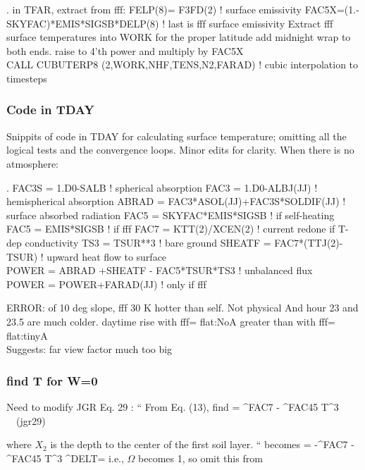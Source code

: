 .
\qi in TFAR, extract from fff: FELP(8)= F3FD(2)        ! surface emissivity
\qi FAC5X=(1.-SKYFAC)*EMIS*SIGSB*DELP(8) ! last is fff surface emissivity
\qi Extract fff surface temperatures into WORK for the proper latitude
\qii add midnight wrap to both ends.
\qii raise to 4'th power and multiply by FAC5X
\\ CALL CUBUTERP8 (2,WORK,NHF,TENS,N2,FARAD) ! cubic interpolation to timesteps

\subsubsection{Code in TDAY}

Snippits of code in TDAY for calculating surface temperature; omitting all the logical tests and the convergence loops.  Minor edits for clarity.  
When there is no atmosphere:

.
\qii   FAC3S = 1.D0-SALB         ! spherical absorption
\qii   FAC3  = 1.D0-ALBJ(JJ) ! hemispherical absorption
\qi   ABRAD = FAC3*ASOL(JJ)+FAC3S*SOLDIF(JJ) ! surface absorbed radiation
\qii   FAC5 = SKYFAC*EMIS*SIGSB ! if self-heating 
\qii   FAC5 = EMIS*SIGSB ! if fff 
\qii   FAC7 = KTT(2)/XCEN(2)    ! current redone if T-dep conductivity
\qii   TS3 = TSUR**3         ! bare ground
\qi   SHEATF = FAC7*(TTJ(2)-TSUR) ! upward heat flow to surface
\\ POWER = ABRAD +SHEATF - FAC5*TSUR*TS3 ! unbalanced flux
\\ POWER = POWER+FARAD(JJ) ! only if fff


ERROR: of 10 deg slope, fff 30 K hotter than self. Not physical
\qi And  hour 23 and 23.5 are much colder.
\qi daytime rise with fff= flat:NoA greater than with fff= flat:tinyA
\\ Suggests: far view factor much too big

\subsubsection{find T for W=0} %
Need to modify JGR Eq. 29 : ``
 From Eq. (13), find 
\qbn {} = ^{FAC7} - \overbrace{4 \Omega \epsilon \sigma}^{FAC45} T^3  \ \ (jgr29) \qen 

 where $X_2$ is the depth to the center of the first soil layer. `` becomes \qbn
  = -^{FAC7} -\overbrace{4
   \epsilon \sigma}^{FAC45} T^3  ^{DELT}=
  \qen i.e., $\Omega$ becomes 1, so
 omit this from 
 
